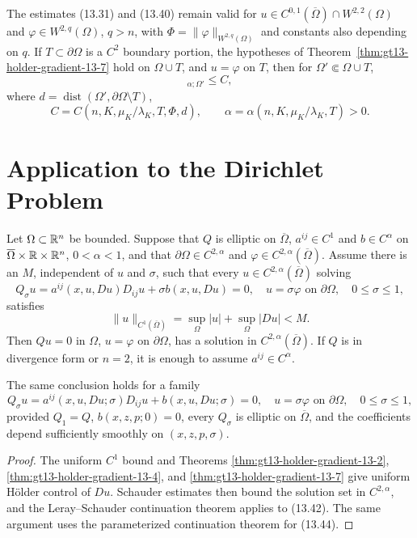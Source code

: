 The estimates \textup{(13.31)} and \textup{(13.40)} remain valid for
$u\in C^{0,1}(\overline\Omega)\cap W^{2,2}(\Omega)$ and
$\varphi\in W^{2,q}(\Omega)$, $q>n$, with
$\Phi=\|\varphi\|_{W^{2,q}(\Omega)}$ and constants also depending on $q$.
If $T\subset\partial\Omega$ is a $C^2$ boundary portion, the hypotheses of
Theorem~\ref{thm:gt13-holder-gradient-13-7} hold on $\Omega\cup T$, and
$u=\varphi$ on $T$, then for $\Omega'\Subset\Omega\cup T$,
\begin{equation}
[Du]_{\alpha;\Omega'}\le C,
\tag{13.41}
\end{equation}
where $d=\operatorname{dist}(\Omega',\partial\Omega\setminus T)$,
\[
C=C(n,K,\mu_K/\lambda_K,T,\Phi,d),
\qquad
\alpha=\alpha(n,K,\mu_K/\lambda_K,T)>0.
\]

\section{Application to the Dirichlet Problem}

\begin{theorem}
\label{thm:gt13-holder-gradient-13-8}
Let $\Omega\subset\mathbb{R}^n$ be bounded.  Suppose that $Q$ is elliptic on
$\overline\Omega$, $a^{ij}\in C^1$ and $b\in C^\alpha$ on
$\overline\Omega\times\mathbb{R}\times\mathbb{R}^n$, $0<\alpha<1$, and that
$\partial\Omega\in C^{2,\alpha}$ and
$\varphi\in C^{2,\alpha}(\overline\Omega)$.  Assume there is an $M$,
independent of $u$ and $\sigma$, such that every
$u\in C^{2,\alpha}(\overline\Omega)$ solving
\begin{equation}
Q_\sigma u=a^{ij}(x,u,Du)D_{ij}u+\sigma b(x,u,Du)=0,
\quad u=\sigma\varphi\text{ on }\partial\Omega,\quad 0\le\sigma\le1,
\tag{13.42}
\end{equation}
satisfies
\begin{equation}
\|u\|_{C^1(\overline\Omega)}
=\sup_\Omega|u|+\sup_\Omega|Du|<M.
\tag{13.43}
\end{equation}
Then $Qu=0$ in $\Omega$, $u=\varphi$ on $\partial\Omega$, has a solution
in $C^{2,\alpha}(\overline\Omega)$.  If $Q$ is in divergence form or
$n=2$, it is enough to assume $a^{ij}\in C^\alpha$.

The same conclusion holds for a family
\begin{equation}
Q_\sigma u=a^{ij}(x,u,Du;\sigma)D_{ij}u+b(x,u,Du;\sigma)=0,
\quad u=\sigma\varphi\text{ on }\partial\Omega,\quad 0\le\sigma\le1,
\tag{13.44}
\end{equation}
provided $Q_1=Q$, $b(x,z,p;0)=0$, every $Q_\sigma$ is elliptic on
$\overline\Omega$, and the coefficients depend sufficiently smoothly on
$(x,z,p,\sigma)$.
\end{theorem}
\begin{proof}
\sketch The uniform $C^1$ bound and Theorems
\ref{thm:gt13-holder-gradient-13-2},
\ref{thm:gt13-holder-gradient-13-4}, and
\ref{thm:gt13-holder-gradient-13-7} give uniform H\"older control of $Du$.
Schauder estimates then bound the solution set in $C^{2,\alpha}$, and the
Leray--Schauder continuation theorem applies to \textup{(13.42)}.  The same
argument uses the parameterized continuation theorem for \textup{(13.44)}.
\end{proof}
